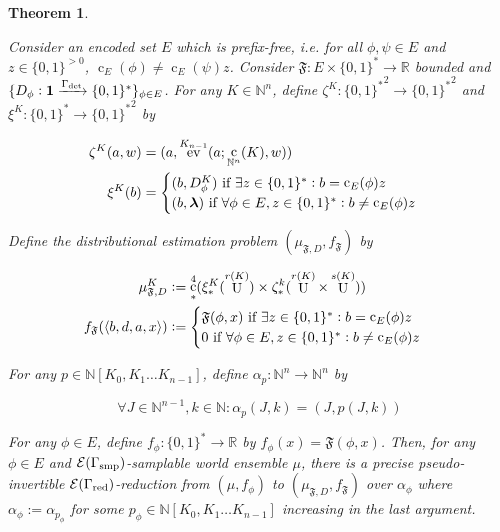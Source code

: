 \documentclass{article}
\numberwithin{equation}{section}
\theoremstyle{definition}
\theoremstyle{plain}
\newtheorem{theorem}{Theorem}[section]
\newcommand{\Bool}{\{0,1\}}
\newcommand{\Words}{{\Bool^*}}
\DeclareMathOperator{\Ev}{ev}
\DeclareMathOperator{\Un}{U}
\DeclareMathOperator{\En}{c}
\newcommand{\Nats}{\mathbb{N}}
\newcommand{\Reals}{\mathbb{R}}
\newcommand{\NatPoly}{\Nats[K_0, K_1 \ldots K_{n-1}]}
\newcommand{\NatFun}{\Nats^n \rightarrow}
\newcommand{\Estr}{\bm{\lambda}}
\newcommand{\Chev}[1]{\langle #1 \rangle}
\newcommand{\Fall}{\mathcal{E}}
\begin{document}
\begin{samepage}
\begin{theorem}
\label{thm:complete}

Consider an encoded set ${E}$ which is prefix-free, i.e. for all ${\phi,\psi \in E}$ and ${z \in \Bool^{>0}}$, ${\En_E(\phi) \ne \En_E(\psi)z}$. Consider ${\mathfrak{F}: E \times \Words \rightarrow \Reals}$ bounded and ${\{D_\phi: \bm{1} \xrightarrow{\Gamma_{\textnormal{det}}} \Words\}_{\phi \in E}}$. For any ${K \in \Nats^n}$, define ${\zeta^K: \Words^2 \rightarrow \Words^2}$ and ${\xi^K: \Words \rightarrow \Words^2}$ by 

\begin{align}
\zeta^K(a,w)&=(a,\Ev^{K_{n-1}}(a;\En_{\Nats^n}(K),w))\\
\xi^K(b)&=\begin{cases}(b,D_\phi^K) \textnormal{ if } \exists z \in \Words: b=\En_E(\phi)z \\ (b,\Estr) \textnormal{ if } \forall \phi \in E, z \in \Words: b \ne \En_E(\phi)z\end{cases}
\end{align}

Define the distributional estimation problem $({\mu_{\mathfrak{F},D}},f_{\mathfrak{F}})$ by 

\begin{align}
\mu_{\mathfrak{F},D}^K&:=\En_*^4 (\xi_*^K(\Un^{r(K)}) \times \zeta_*^k(\Un^{r(K)} \times \Un^{s(K)})) \\
f_{\mathfrak{F}}(\Chev{b,d,a,x}) &:= \begin{cases}\mathfrak{F}(\phi, x) \textnormal{ if } \exists z \in \Words: b=\En_E(\phi)z \\ 0 \textnormal{ if } \forall \phi \in E, z \in \Words: b \ne \En_E(\phi)z\end{cases}
\end{align}

For any ${p \in \NatPoly}$, define ${\alpha_p: \NatFun \Nats^n}$ by

\begin{equation}
\forall J \in \Nats^{n-1}, k \in \Nats: \alpha_p(J,k) = (J,p(J,k))
\end{equation}

For any ${\phi \in E}$, define ${f_\phi: \Words \rightarrow \Reals}$ by ${f_\phi(x)=\mathfrak{F}(\phi,x)}$. Then, for any ${\phi \in E}$ and ${\Fall(\Gamma_{\textnormal{smp}})}$-samplable world ensemble ${\mu}$, there is a precise pseudo-invertible ${\Fall(\Gamma_{\textnormal{red}})}$-reduction from ${(\mu,f_\phi)}$ to ${(\mu_{\mathfrak{F},D}, f_{\mathfrak{F}})}$ over ${\alpha_{\phi}}$ where ${\alpha_\phi:=\alpha_{p_\phi}}$ for some ${p_\phi \in \NatPoly}$ increasing in the last argument.

\end{theorem}
\end{samepage}
\end{document}

